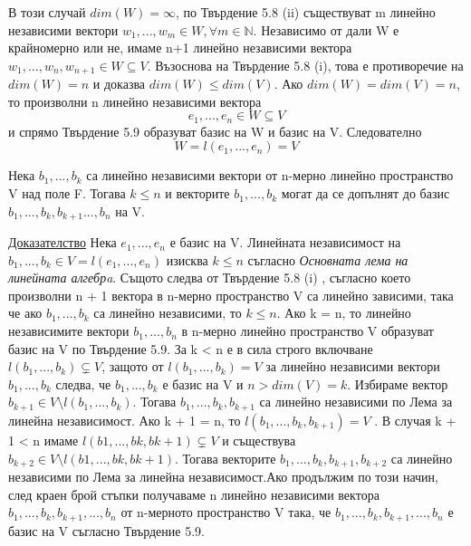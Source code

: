 \documentclass{article}
\begin{document}
В този случай $dim(W)=\infty$, по Твърдение 5.8 (ii) съществуват m линейно независими вектори $w_1,...,w_m\in W, \forall m\in\mathbb{N}$.
Независимо от дали W е крайномерно или не, имаме n+1 линейно независими вектора $w_1,...,w_n,w_{n+1}\in W \subseteq V$. Възоснова на Твърдение 5.8 (i),
това е противоречие на $dim(W)=n$ и доказва $dim(W)\leq dim(V)$. Ако $dim(W)=dim(V)=n$, то произволни n линейно независими вектора
\[
    e_1,...,e_n\in W\subseteq V
\]
и спрямо Твърдение 5.9 образуват базис на W и базис на V. Следователно
\[
    W=l(e_1,...,e_n)=V
\]
\begin{tcolorbox}[title = Твърдение 5.10, colframe = blue!70!black, colback = blue!10!white]
    Нека $b_1,...,b_k$ са линейно независими вектори от n-мерно линейно пространство V над поле F. Тогава $k \leq n$ и векторите
    $b_1,...,b_k$ могат да се допълнят до базис $b_1,...,b_k,b_{k+1}...,b_n$ на V.
\end{tcolorbox}
\underline{Доказателство} Нека $e_1,...,e_n$ е базис на V. Линейната независимост на
$b_1,...,b_k \in V = l(e_1,...,e_n)$ изисква $k \leq n$ съгласно \emph{Основната лема на линейната алгебрa}. Същото следва от Твърдение 5.8 (i) , съгласно което
произволни n + 1 вектора в n-мерно пространство V са линейно зависими, така че ако $b_1,..., b_k$ са линейно независими, то $k \leq n$.
Ако k = n, то линейно независимите вектори $b_1,..., b_n$ в n-мерно линейно пространство V образуват базис на V по Твърдение 5.9.
За k < n е в сила строго включване $l(b_1,..., b_k)\subsetneq V$, защото от $l(b_1,...,b_k) = V$ за линейно независими вектори $b_1,..., b_k$ следва, че $b_1,..., b_k$ е базис на V и
$n>dim(V ) = k$. Избираме вектор $b_{k+1} \in V \setminus l(b_1,..., b_k)$. Тогава $b_1,..., b_k, b_{k+1}$
са линейно независими по Лема за линейна независимост. Ако k + 1 = n, то $l(b_1,...,b_k,b_{k+1}) = V$ . В случая k + 1 < n имаме $l(b1, . . . , bk, bk+1)\subsetneq V$
и съществува $b_{k+2} \in V \setminus l(b1, . . . , bk, bk+1)$. Тогава векторите $b_1,...,b_k, b_{k+1}, b_{k+2}$ са линейно независими по Лема за линейна независимост.Ако продължим по
този начин, след краен брой стъпки получаваме n линейно независими вектора $b_1,...,b_k,b_{k+1},..., b_n$ от n-мерното пространство V така, че $b_1,...,b_k, b_{k+1},..., b_n$ е базис на V съгласно Твърдение 5.9.
\end{document}

